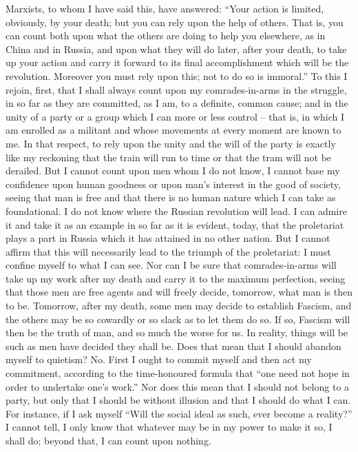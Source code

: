 \documentclass[12pt]{article}
\begin{document}
Marxists, to whom I have said this, have answered: “Your action is limited, obviously, by your death; but you can rely upon the help of others. That is, you can count both upon what the others are doing to help you elsewhere, as in China and in Russia, and upon what they will do later, after your death, to take up your action and carry it forward to its final accomplishment which will be the revolution. Moreover you must rely upon this; not to do so is immoral.” To this I rejoin, first, that I shall always count upon my comrades-in-arms in the struggle, in so far as they are committed, as I am, to a definite, common cause; and in the unity of a party or a group which I can more or less control – that is, in which I am enrolled as a militant and whose movements at every moment are known to me. In that respect, to rely upon the unity and the will of the party is exactly like my reckoning that the train will run to time or that the tram will not be derailed. But I cannot count upon men whom I do not know, I cannot base my confidence upon human goodness or upon man’s interest in the good of society, seeing that man is free and that there is no human nature which I can take as foundational. I do not know where the Russian revolution will lead. I can admire it and take it as an example in so far as it is evident, today, that the proletariat plays a part in Russia which it has attained in no other nation. But I cannot affirm that this will necessarily lead to the triumph of the proletariat: I must confine myself to what I can see. Nor can I be sure that comrades-in-arms will take up my work after my death and carry it to the maximum perfection, seeing that those men are free agents and will freely decide, tomorrow, what man is then to be. Tomorrow, after my death, some men may decide to establish Fascism, and the others may be so cowardly or so slack as to let them do so. If so, Fascism will then be the truth of man, and so much the worse for us. In reality, things will be such as men have decided they shall be. Does that mean that I should abandon myself to quietism? No. First I ought to commit myself and then act my commitment, according to the time-honoured formula that “one need not hope in order to undertake one’s work.” Nor does this mean that I should not belong to a party, but only that I should be without illusion and that I should do what I can. For instance, if I ask myself “Will the social ideal as such, ever become a reality?” I cannot tell, I only know that whatever may be in my power to make it so, I shall do; beyond that, I can count upon nothing.
\end{document}
